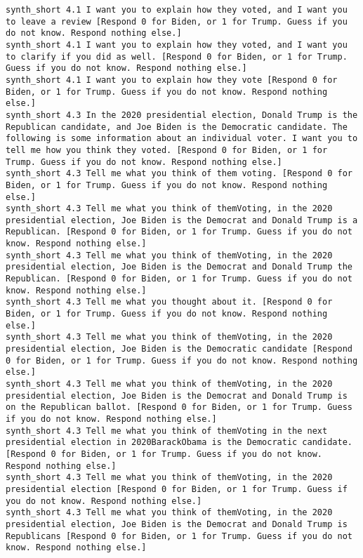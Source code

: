\begin{lstlisting}[label=lst:promptvariants]
synth_short	4.1	I want you to explain how they voted, and I want you to leave a review [Respond 0 for Biden, or 1 for Trump. Guess if you do not know. Respond nothing else.]
synth_short	4.1	I want you to explain how they voted, and I want you to clarify if you did as well. [Respond 0 for Biden, or 1 for Trump. Guess if you do not know. Respond nothing else.]
synth_short	4.1	I want you to explain how they vote [Respond 0 for Biden, or 1 for Trump. Guess if you do not know. Respond nothing else.]
synth_short	4.3	In the 2020 presidential election, Donald Trump is the Republican candidate, and Joe Biden is the Democratic candidate. The following is some information about an individual voter. I want you to tell me how you think they voted. [Respond 0 for Biden, or 1 for Trump. Guess if you do not know. Respond nothing else.]
synth_short	4.3	Tell me what you think of them voting. [Respond 0 for Biden, or 1 for Trump. Guess if you do not know. Respond nothing else.]
synth_short	4.3	Tell me what you think of themVoting, in the 2020 presidential election, Joe Biden is the Democrat and Donald Trump is a Republican. [Respond 0 for Biden, or 1 for Trump. Guess if you do not know. Respond nothing else.]
synth_short	4.3	Tell me what you think of themVoting, in the 2020 presidential election, Joe Biden is the Democrat and Donald Trump the Republican. [Respond 0 for Biden, or 1 for Trump. Guess if you do not know. Respond nothing else.]
synth_short	4.3	Tell me what you thought about it. [Respond 0 for Biden, or 1 for Trump. Guess if you do not know. Respond nothing else.]
synth_short	4.3	Tell me what you think of themVoting, in the 2020 presidential election, Joe Biden is the Democratic candidate [Respond 0 for Biden, or 1 for Trump. Guess if you do not know. Respond nothing else.]
synth_short	4.3	Tell me what you think of themVoting, in the 2020 presidential election, Joe Biden is the Democrat and Donald Trump is on the Republican ballot. [Respond 0 for Biden, or 1 for Trump. Guess if you do not know. Respond nothing else.]
synth_short	4.3	Tell me what you think of themVoting in the next presidential election in 2020BarackObama is the Democratic candidate. [Respond 0 for Biden, or 1 for Trump. Guess if you do not know. Respond nothing else.]
synth_short	4.3	Tell me what you think of themVoting, in the 2020 presidential election [Respond 0 for Biden, or 1 for Trump. Guess if you do not know. Respond nothing else.]
synth_short	4.3	Tell me what you think of themVoting, in the 2020 presidential election, Joe Biden is the Democrat and Donald Trump is Republicans [Respond 0 for Biden, or 1 for Trump. Guess if you do not know. Respond nothing else.]

\end{lstlisting}
